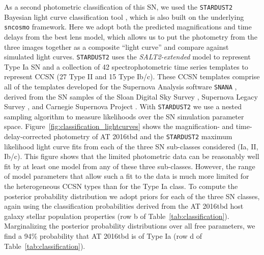 \documentclass[12pt]{article}
\def\SNABC{AT 2016tbd\xspace}
\begin{document}
As a second photometric classification of this SN, we used the {\tt STARDUST2} Bayesian light curve classification tool \cite{rodney_type_2014}, which is also built on the underlying {\tt sncosmo} framework. Here we adopt both the predicted magnifications and time delays from the best lens model, which allows us to put the photometry from the three images together as a composite ``light curve'' and compare against simulated light curves.  {\tt STARDUST2} uses the {\it SALT2-extended} model to represent Type Ia SN \cite{guy_salt2:_2007, pierel_extending_2018} and a collection of 42  spectrophotometric time series templates to represent CCSN (27 Type II and 15 Type Ib/c).  These CCSN templates comprise all of the templates developed for the Supernova Analysis software {\tt SNANA} \cite{kessler_snana:_2009}, derived from the SN samples of the Sloan Digital Sky Survey \cite{frieman_sloan_2008,sako_sloan_2008, dandrea_type_2010}, Supernova Legacy Survey \cite{astier_supernova_2006}, and Carnegie Supernova Project \cite{hamuy_carnegie_2006, stritzinger_he-rich_2009, morrell_carnegie_2012}.  With {\tt STARDUST2} we use a nested sampling algorithm to measure likelihoods over the SN simulation parameter space.  
Figure~\ref{fig:classification_lightcurves} shows the magnification- and time-delay-corrected photometry of \SNABC and the {\tt STARDUST2} maximum likelihood light curve fits from each of the three SN sub-classes considered (Ia, II, Ib/c).
This figure shows that the limited photometric data can be reasonably well fit by at least one model from any of these three sub-classes. However, the range of model parameters that allow such a fit to the data is much more limited for the heterogeneous CCSN types than for the Type Ia class.   
To compute the posterior probability distribution we adopt priors for each of the three SN classes, again using the classification probabilities derived from the \SNABC host galaxy stellar population properties (row b of Table~\ref{tab:classification}). 
Marginalizing the posterior  probability distributions over all free parameters, we find a 94\% probability that \SNABC is of Type Ia (row d of Table~\ref{tab:classification}).  


\end{document}
